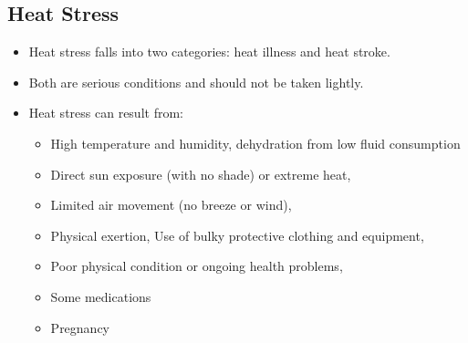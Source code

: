 \subsection{Heat Stress}
\begin{itemize}
\item Heat stress falls into two categories: heat illness and heat stroke. 
\item Both are serious conditions and should not be taken lightly. 
\item Heat stress can result from: 
\begin{itemize}
\item High temperature and humidity, dehydration from low fluid consumption
\item Direct sun exposure (with no shade) or extreme heat, 
\item Limited air movement (no breeze or wind), 
\item Physical exertion, Use of bulky protective clothing and equipment, 
\item Poor physical condition or ongoing health problems, 
\item Some medications
\item Pregnancy
\end{itemize}
\end{itemize} 

